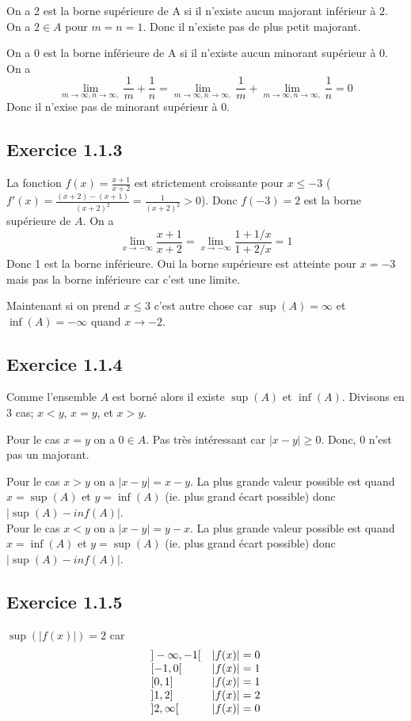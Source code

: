 \documentclass[]{book}
\theoremstyle{definition}
\begin{document}
On a 2 est la borne sup\'erieure de A si il n'existe aucun majorant inf\'erieur \`a $2$. On a $2 \in A$ pour $m=n=1$. Donc il n'existe pas de plus petit majorant.

On a 0 est la borne inf\'erieure de A si il n'existe aucun minorant sup\'erieur \`a $0$. On a 
$$\lim_{m \to \infty, n \to \infty,}\frac{1}{m} + \frac{1}{n} = \lim_{m \to \infty, n \to \infty,}\frac{1}{m} + \lim_{m \to \infty, n \to \infty,} \frac{1}{n} = 0$$
Donc il n'exise pas de minorant sup\'erieur \`a 0.


\subsection*{Exercice 1.1.3}
La fonction $f(x)=\frac{x+1}{x+2}$ est strictement croissante pour $x \leq -3$ ($f'(x) = \frac{(x+2)-(x+1)}{(x+2)^2} = \frac{1}{(x+2)^2} > 0$). Donc $f(-3) =  2$ est la borne sup\'erieure de $A$. On a 
$$\lim_{x \to -\infty} \frac{x+1}{x+2} = \lim_{x \to -\infty} \frac{1+1/x}{1+2/x} = 1$$
Donc 1 est la borne inf\'erieure.
Oui la borne sup\'erieure est atteinte pour $x=-3$ mais pas la borne inf\'erieure car c'est une limite.

Maintenant si on prend $x \leq 3$ c'est autre chose car $\sup(A) = \infty$ et $\inf(A) = -\infty$ quand $x \to -2$.

\subsection*{Exercice 1.1.4}
Comme l'ensemble $A$ est born\'e alors il existe $\sup(A)$ et $\inf(A)$. Divisons en 3 cas; $x < y$, $x=y$, et $x > y$.

Pour le cas $x=y$ on a $0 \in A$. Pas tr\`es int\'eressant car $|x-y| \geq 0$. Donc, 0 n'est pas un majorant. 

Pour le cas $x>y$ on a $|x-y| = x - y$. La plus grande valeur possible est quand $x=\sup(A)$ et $y = \inf(A)$ (ie. plus grand \'ecart possible) donc $|\sup(A)-inf(A)|$. \\
Pour le cas $x<y$ on a $|x-y| = y - x$. La plus grande valeur possible est quand $x=\inf(A)$ et $y = \sup(A)$ (ie. plus grand \'ecart possible) donc $|\sup(A)-inf(A)|$. \\


\subsection*{Exercice 1.1.5}
$\sup(|f(x)|) = 2$ car 
$$
\begin{array}{l l}
{]-\infty,-1[} & |f(x)| = 0 \\
{[-1,0[} & |f(x)| = 1 \\
{[0, 1]} & |f(x)| = 1 \\
{]1,2]} & |f(x)| = 2 \\
{]2,\infty[} & |f(x)| = 0 \\
\end{array}
$$
\end{document}
